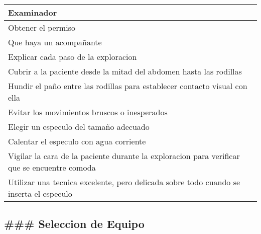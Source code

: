 \documentclass[
]{article}
\begin{document}
\begin{longtable}[]{@{}l@{}}
\toprule
\begin{minipage}[b]{0.97\columnwidth}\raggedright
Examinador\strut
\end{minipage}\tabularnewline
\midrule
\endhead
\begin{minipage}[t]{0.97\columnwidth}\raggedright
Obtener el permiso\strut
\end{minipage}\tabularnewline
\begin{minipage}[t]{0.97\columnwidth}\raggedright
Que haya un acompañante\strut
\end{minipage}\tabularnewline
\begin{minipage}[t]{0.97\columnwidth}\raggedright
Explicar cada paso de la exploracion\strut
\end{minipage}\tabularnewline
\begin{minipage}[t]{0.97\columnwidth}\raggedright
Cubrir a la paciente desde la mitad del abdomen hasta las rodillas\strut
\end{minipage}\tabularnewline
\begin{minipage}[t]{0.97\columnwidth}\raggedright
Hundir el paño entre las rodillas para establecer contacto visual con
ella\strut
\end{minipage}\tabularnewline
\begin{minipage}[t]{0.97\columnwidth}\raggedright
Evitar los movimientos bruscos o inesperados\strut
\end{minipage}\tabularnewline
\begin{minipage}[t]{0.97\columnwidth}\raggedright
Elegir un especulo del tamaño adecuado\strut
\end{minipage}\tabularnewline
\begin{minipage}[t]{0.97\columnwidth}\raggedright
Calentar el especulo con agua corriente\strut
\end{minipage}\tabularnewline
\begin{minipage}[t]{0.97\columnwidth}\raggedright
Vigilar la cara de la paciente durante la exploracion para verificar que
se encuentre comoda\strut
\end{minipage}\tabularnewline
\begin{minipage}[t]{0.97\columnwidth}\raggedright
Utilizar una tecnica excelente, pero delicada sobre todo cuando se
inserta el especulo\strut
\end{minipage}\tabularnewline
\bottomrule
\end{longtable}

\hypertarget{seleccion-de-equipo}{%
\subsection{\#\#\# Seleccion de Equipo}\label{seleccion-de-equipo}}
\end{document}
